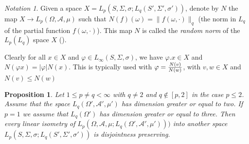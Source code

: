 \documentclass[11pt]{amsart}
\theoremstyle{plain}
\newtheorem{proposition}[theorem]{Proposition}
\theoremstyle{remark}
\newtheorem{notation}[theorem]{Notation}
\newcommand{\A}{\mathcal A}
\newcommand{\ph}{\varphi}
\begin{document}
\begin{notation}
Given a space $X=L_p(S,\Sigma,\sigma;L_q(S',\Sigma',\sigma'))$, denote by $N$ the map $X\to L_p(\Omega,\A,\mu)$ such that $N(f)(\omega)=\|f(\omega,\cdot)\|_q$ (the norm in $L_q$ of the partial function $f(\omega,\cdot)$). This map $N$ is called the {\it random norm} of the $L_p(L_q)$ space $X$ (\cite{LR,HR}). 

Clearly for all $x\in X$ and $\ph\in L_\infty(S,\Sigma,\sigma)$, we have $\ph.x\in X$ and $N(\ph x)=|\ph|N(x)$.  This is typically used with $\ph={N(v)\over N(w)}$, with $v,w\in X$ and $N(v)\le N(w)$ 
\end{notation}

\begin {proposition}\label{DP-for-LpLq-isometries} Let $1\le p\ne q<\infty$ with $q\ne 2$ and $q\not\in [p,2]$ in the case  $p\le 2$. Assume that the space  $L_q(\Omega',\A',\mu')$ has dimension greater or equal to two. If $p=1$ we assume that $L_q(\Omega')$ has dimension greater or equal to three. Then every linear isometry of $L_p(\Omega,\A,\mu;L_q(\Omega',\A',\mu')))$ into  another space $L_p(S,\Sigma,\sigma;L_q(S',\Sigma',\sigma'))$ is disjointness preserving.
\end{proposition}
\end{document}
